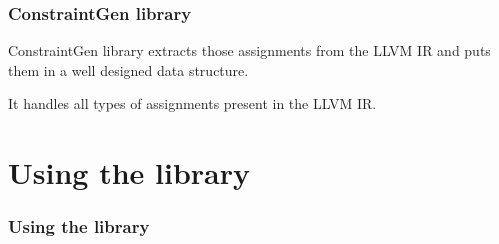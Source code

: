\documentclass{beamer}
\begin{document}
\begin{frame}
\frametitle{ConstraintGen library}
ConstraintGen library extracts those assignments from the LLVM IR and puts
them in a well designed data structure.

\vspace{15pt}
\pause
It handles all types of assignments present in the LLVM IR.

\end{frame}

\section{Using the library}
\begin{frame}
\frametitle{Using the library}
\end{frame}
\end{document}
